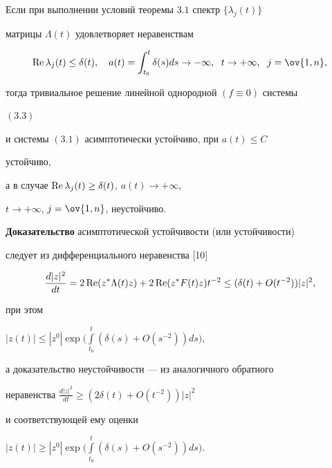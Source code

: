  


\begin{thms} 


Если при выполнении условий теоремы $3.1$ спектр $\{\lambda_j(t)\}$ 


матрицы $\Lambda(t)$ удовлетворяет неравенствам 


$$ 


\re\lambda_j(t)\le\delta(t),\quad 


a(t)=\int^t_{t_0}\delta(s)ds\to-\infty,\ \;t\to+\infty, 


\ \; j=\ov{1,n}, 


$$ 


тогда тривиальное решение линейной однородной $(f\equiv0)$ системы 


$(3.3)$ 


и системы $(3.1)$ асимптотически устойчиво, при $a(t)\le C$ 


устойчиво,


а в случае $\operatorname{Re}\lambda_j(t)\ge\delta(t)$, $a(t)\to+\infty$, 


$t\to+\infty$, $j=\ov{1,n}$, неустойчиво. 


\end{thms} 


 


{\bf Доказательство} асимптотической устойчивости (или устойчивости)  


следует из дифференциального неравенства [10] 


$$ 


\frac{d|z|^2}{d t}=2\re(z^*\Lambda(t)z)+ 


2\re(z^*F(t)z)t^{-2}\le(\delta(t)+O(t^{-2}))|z|^2, 


$$ 


при этом 


$|z(t)|\le|z^0|\exp\Big(\int\limits^t_{t_0}(\delta(s)+ 


O(s^{-2}))ds\Big)$, 


а доказательство неустойчивости --- из аналогичного обратного 


неравенства $\frac{d|z|^2}{d t}\ge(2\delta(t)+O(t^{-2}))|z|^2$ 


и соответствующей ему оценки 


$|z(t)|\ge|z^0|\exp\Big(\int\limits^t_{t_0}(\delta(s)+ 


O(s^{-2}))ds\Big)$. 


\medskip 


 


